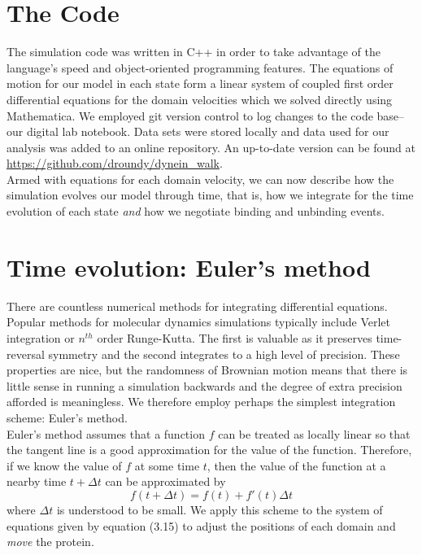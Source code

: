 \section{The Code}
The simulation code was written in C++ in order to take advantage of the language's speed and object-oriented programming features. The equations of motion for our model in each state form a linear system of coupled first order differential equations for the domain velocities which we solved directly using Mathematica. We employed git version control to log changes to the code base-- our digital lab notebook. Data sets were stored locally and data used for our analysis was added to an online repository. An up-to-date version can be found at \url{https://github.com/droundy/dynein_walk}.\\

Armed with equations for each domain velocity, we can now describe how the simulation evolves our model through time, that is, how we integrate for the time evolution of each state \textit{and} how we negotiate binding and unbinding events.
 
	\section{Time evolution: Euler's method}
	There are countless numerical methods for integrating differential equations. Popular methods for molecular dynamics simulations typically include Verlet integration or $n^{th}$ order Runge-Kutta. The first is valuable as it preserves time-reversal symmetry and the second integrates to a high level of precision. These properties are nice, but the randomness of Brownian motion means that there is little sense in running a simulation backwards and the degree of extra precision afforded is meaningless. We therefore employ perhaps the simplest integration scheme: Euler's method. \\
	
	Euler's method assumes that a function $f$ can be treated as locally linear so that the tangent line is a good approximation for the value of the function. Therefore, if we know the value of $f$ at some time $t$, then the value of the function at a nearby time $t+\Delta t$ can be approximated by 
	\begin{equation}
		f(t+\Delta t) = f(t)+f'(t)\Delta t
	\end{equation}
	where $\Delta t$ is understood to be small. We apply this scheme to the system of equations given by equation (3.15) to adjust the positions of each domain and \textit{move} the protein. 
	
